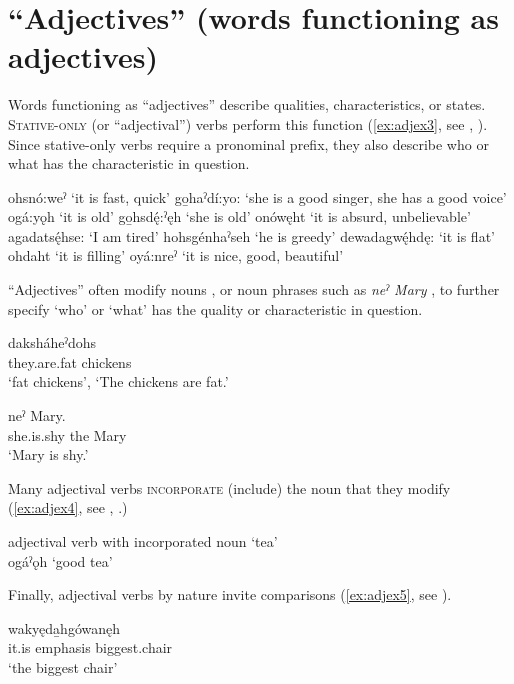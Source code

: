 \chapter{“Adjectives” (words functioning as adjectives)} \label{ch:’Adjectives’ (words that function as adjectives)}
Words functioning as “adjectives” describe qualities, characteristics, or states. \textsc{Stative-only} (or “adjectival”) verbs perform this function (\ref{ex:adjex3}, see , ). Since stative-only verbs require a pronominal prefix, they also describe who or what has the characteristic in question. 

\ea\label{ex:adjex3}
\ea ohsnó:weˀ ‘it is fast, quick’
\ex go̱haˀdí:yo: ‘she is a good singer, she has a good voice’
\ex ogá:yǫh ‘it is old’
\ex go̱hsdę́:ˀęh ‘she is old’
\ex onówęht ‘it is absurd, unbelievable’
\ex agadatsę́hse: ‘I am tired’
\ex hohsgénhaˀseh ‘he is greedy’
\ex dewadagwę́hdę: ‘it is flat’
\ex ohdaht ‘it is filling’
\ex oyá:nreˀ ‘it is nice, good, beautiful’
\z
\z


“Adjectives” often modify nouns , or noun phrases such as \textit{neˀ Mary} , to further specify ‘who’ or ‘what’ has the quality or characteristic in question.

\ea\label{ex:adjex2}
 \gll {} daksháheˀdohs\\
they.are.fat chickens\\
\glt ‘fat chickens’, ‘The chickens are fat.’
\z

\ea\label{ex:adjex}
 \gll {} neˀ Mary.\\
she.is.shy the Mary\\
\glt ‘Mary is shy.’
\z

Many adjectival verbs \textsc{incorporate} (include) the noun that they modify (\ref{ex:adjex4}, see , .)

\ea\label{ex:adjex4} adjectival verb with incorporated noun  ‘tea’\\
ogáˀǫh ‘good tea’
\z


Finally, adjectival verbs by nature invite comparisons (\ref{ex:adjex5}, see ).

\ea\label{ex:adjex5}
 \gll {}  wakyęda̱hgówanęh \\
it.is emphasis biggest.chair\\
\glt ‘the biggest chair’
\z

